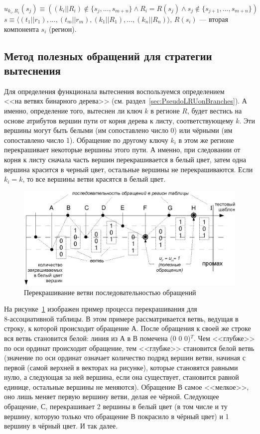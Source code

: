 $$u_{k_i,R_i}(s_j) \equiv ((k_i||R_i) \notin \{s_j, ..., s_{m+n}\} \wedge R_i = R(s_j) \wedge s_j \notin\{s_{j+1},..., s_{m+n}\})$$
$s \equiv \langle (t_1||r_1), ..., (t_m||r_m), (k_1||R_1), ..., (k_n||R_n)\rangle$, $R(s_i)$ --- вторая компонента $s_i$ (регион).


\subsection{Метод полезных обращений для стратегии вытеснения \PseudoLRU}

Для определения функционала вытеснения воспользуемся определением\\\PseudoLRU <<на ветвях бинарного дерева>> (см. раздел~\ref{sec:PseudoLRUonBranches}). А именно, определение того, вытеснен ли ключ $k$ в регионе $R$, будет вестись на основе атрибутов вершин пути от корня дерева к  листу, соответствующему $k$. Эти вершины могут быть белыми (им сопоставлено число 0) или чёрными (им сопоставлено число 1). Обращение по другому ключу $k_i$ в этом же регионе перекрашивает некоторые вершины этого пути. А именно, при следовании от корня к листу сначала часть вершин перекрашивается в белый цвет, затем одна вершина красится в черный цвет, остальные вершины не перекрашиваются. Если $k_i = k$, то все вершины ветви красятся в белый цвет.

  \begin{figure}[h] \center
  \includegraphics[width=\textwidth]{2.theor/plru_usefl_exmp}
  \caption{Перекрашивание ветви последовательностью обращений}\label{fig:plru_exmp_vytesn}
  \end{figure}

На рисунке~\ref{fig:plru_exmp_vytesn} изображен пример процесса перекрашивания для \\8-ассоциативной таблицы. В этом примере рассматривается ветвь, ведущая в строку, к которой происходит обращение А. После обращения к своей же строке вся ветвь становится белой: линия из А в В помечена (0 0 0)$^T$. Чем <<глубже>> по оси ординат происходит обращение, тем <<глубже>> становится белой ветвь (значение по оси ординат означает количество подряд вершин ветви, начиная с первой (самой верхней в векторах на рисунке), которые становятся равными нулю, а следующая за ней вершина, если она существует, становится равной единице, остальные вершины не меняются). Обращение В самое <<мелкое>>, оно лишь меняет первую вершину ветви, делая ее чёрной. Следующее обращение, С, перекрашивает 2 вершины в белый цвет (в том числе и ту вершину, которую только что обращение В покрасило в чёрный цвет) и 1 вершину в чёрный цвет. И так далее.

